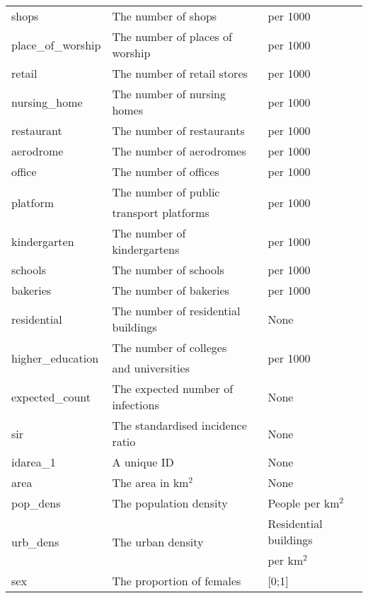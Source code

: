 \begin{table}[H]
\begin{tabular}{l l l}
shops & The number of shops & per 1000 \\
place\_of\_worship & The number of places of worship & per 1000 \\
retail & The number of retail stores & per 1000 \\
nursing\_home & The number of nursing homes & per 1000 \\
restaurant & The number of restaurants & per 1000 \\
aerodrome & The number of aerodromes & per 1000 \\
office & The number of offices & per 1000 \\
\multirow{2}{*}{platform} & The number of public & \multirow{2}{*}{per 1000} \\
& transport platforms \\
kindergarten & The number of kindergartens & per 1000 \\
schools & The number of schools & per 1000 \\
bakeries & The number of bakeries & per 1000 \\
residential & The number of residential buildings & None \\
\multirow{2}{*}{higher\_education} & The number of colleges & \multirow{2}{*}{per 1000} \\
& and universities \\
expected\_count & The expected number of infections & None \\
sir & The standardised incidence ratio & None \\
idarea\_1 & A unique ID & None \\
area & The area in km$^2$ & None \\
pop\_dens & The population density & People per km$^2$ \\
\multirow{2}{*}{urb\_dens} & \multirow{2}{*}{The urban density}  & Residential buildings\\
& & per km$^2$\\
sex & The proportion of females & [0;1] \\
\bottomrule
\end{tabular}
\end{table}